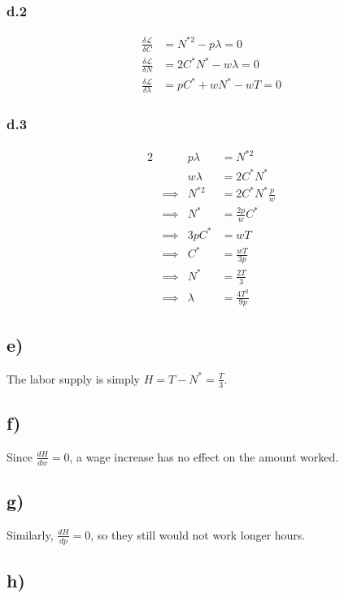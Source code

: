 \documentclass[12pt,letterpaper]{article}
\theoremstyle{definition}
\newcommand{\Lag}{\mathcal{L}}
\begin{document}
\subsubsection*{d.2}

\begin{align*}
  \frac{\delta \Lag}{\delta C} &= N^{*2} - p\lambda = 0\\
  \frac{\delta \Lag}{\delta N} &= 2C^*N^* - w\lambda = 0\\
  \frac{\delta \Lag}{\delta \lambda} &= pC^* + wN^* - wT = 0
\end{align*}

\subsubsection*{d.3}

\begin{alignat*}{2}
  && p\lambda &= N^{*2} \\
  && w\lambda &= 2C^*N^* \\
  &\implies& N^{*2} &= 2C^*N^*\frac{p}{w} \\
  &\implies& N^* &= \frac{2p}{w} C^* \\
  &\implies& 3pC^* &= wT \\
  &\implies& C^* &= \frac{wT}{3p} \\
  &\implies& N^* &= \frac{2T}{3} \\
  &\implies& \lambda &= \frac{4T^2}{9p}
\end{alignat*}

\subsection*{e)}

The labor supply is simply $H = T - N^* = \frac{T}{3}$.

\subsection*{f)}

Since $\frac{dH}{dw} = 0$, a wage increase has no effect on the amount worked.

\subsection*{g)}

Similarly, $\frac{dH}{dp} =0$, so they still would not work longer hours.

\subsection*{h)}
\end{document}
